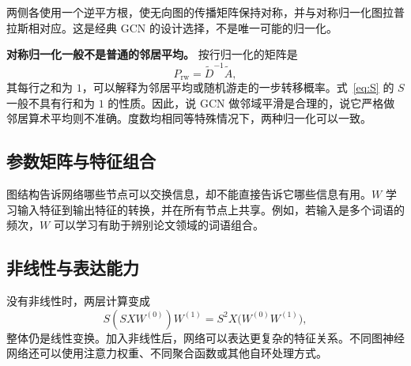 \documentclass[UTF8,a4paper,11pt,fontset=fandol]{ctexart}
\begin{document}
两侧各使用一个逆平方根，使无向图的传播矩阵保持对称，并与对称归一化图拉普拉斯相对应。这是经典 GCN 的设计选择，不是唯一可能的归一化。

\textbf{对称归一化一般不是普通的邻居平均。} 按行归一化的矩阵是
\begin{equation}
P_{\mathrm{rw}}=\widetilde D^{-1}\widetilde A,
\end{equation}
其每行之和为 $1$，可以解释为邻居平均或随机游走的一步转移概率。式~\eqref{eq:S} 的 $S$ 一般不具有行和为 $1$ 的性质。因此，说 GCN 做邻域平滑是合理的，说它严格做邻居算术平均则不准确。度数均相同等特殊情况下，两种归一化可以一致。

\subsection{参数矩阵与特征组合}
图结构告诉网络哪些节点可以交换信息，却不能直接告诉它哪些信息有用。$W$ 学习输入特征到输出特征的转换，并在所有节点上共享。例如，若输入是多个词语的频次，$W$ 可以学习有助于辨别论文领域的词语组合。

\subsection{非线性与表达能力}
没有非线性时，两层计算变成
\begin{equation}
S(SXW^{(0)})W^{(1)}
=S^2X\bigl(W^{(0)}W^{(1)}\bigr),
\end{equation}
整体仍是线性变换。加入非线性后，网络可以表达更复杂的特征关系。不同图神经网络还可以使用注意力权重、不同聚合函数或其他自环处理方式。
\end{document}
